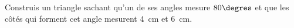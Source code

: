 %
%
	Construis un triangle sachant qu’un de ses angles mesure $80\degres$ et que les côtés qui forment cet angle mesurent \SI{4}{cm} et \SI{6}{cm}.
